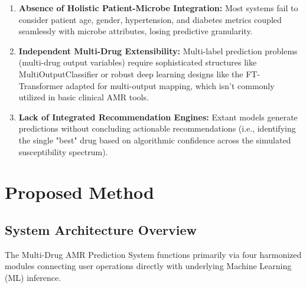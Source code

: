 \documentclass[12pt,a4paper]{report}
\begin{document}
\begin{enumerate}[leftmargin=*]
  \item \textbf{Absence of Holistic Patient-Microbe Integration:} Most systems fail to consider patient age, gender, hypertension, and diabetes metrics coupled seamlessly with microbe attributes, losing predictive granularity.
  \item \textbf{Independent Multi-Drug Extensibility:} Multi-label prediction problems (multi-drug output variables) require sophisticated structures like MultiOutputClassifier or robust deep learning designs like the FT-Transformer adapted for multi-output mapping, which isn't commonly utilized in basic clinical AMR tools.
  \item \textbf{Lack of Integrated Recommendation Engines:} Extant models generate predictions without concluding actionable recommendations (i.e., identifying the single "best" drug based on algorithmic confidence across the simulated susceptibility spectrum).
\end{enumerate}

\chapter{Proposed Method}
\thispagestyle{fancy}

\section{System Architecture Overview}

The Multi-Drug AMR Prediction System functions primarily via four harmonized modules connecting user operations directly with underlying Machine Learning (ML) inference.
\end{document}
